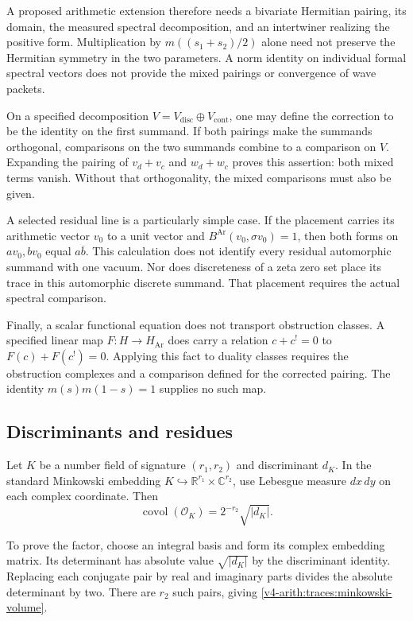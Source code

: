 A proposed arithmetic extension therefore needs a bivariate Hermitian
pairing, its domain, the measured spectral decomposition, and an intertwiner
realizing the positive form. Multiplication by $m((s_1+s_2)/2)$ alone need
not preserve the Hermitian symmetry in the two parameters. A norm identity
on individual formal spectral vectors does not provide the mixed pairings or
convergence of wave packets.

On a specified decomposition $V=V_{\mathrm{disc}}\oplus V_{\mathrm{cont}}$,
one may define the correction to be the identity on the first summand. If
both pairings make the summands orthogonal, comparisons on the two summands
combine to a comparison on $V$. Expanding the pairing of $v_d+v_c$ and
$w_d+w_c$ proves this assertion: both mixed terms vanish. Without that
orthogonality, the mixed comparisons must also be given.

A selected residual line is a particularly simple case. If the placement
carries its arithmetic vector $v_0$ to a unit vector and
$B^{\mathrm{Ar}}(v_0,\sigma v_0)=1$, then both forms on $av_0,bv_0$ equal
$a\overline b$. This calculation does not identify every residual
automorphic summand with one vacuum. Nor does discreteness of a zeta zero
set place its trace in this automorphic discrete summand. That placement
requires the actual spectral comparison.

Finally, a scalar functional equation does not transport obstruction
classes. A specified linear map $F:H\to H_{\mathrm{Ar}}$ does carry a
relation $c+c^!=0$ to $F(c)+F(c^!)=0$. Applying this fact to duality classes
requires the obstruction complexes and a comparison defined for the
corrected pairing. The identity $m(s)m(1-s)=1$ supplies no such map.

\subsection{Discriminants and residues}

Let $K$ be a number field of signature $(r_1,r_2)$ and discriminant $d_K$.
In the standard Minkowski embedding $K\hookrightarrow\mathbb
R^{r_1}\times\mathbb C^{r_2}$, use Lebesgue measure $dx\,dy$ on each complex
coordinate. Then
\begin{equation}
\label{v4-arith:traces:minkowski-volume}
 \operatorname{covol}(\mathcal O_K)
      =2^{-r_2}\sqrt{|d_K|}.
\end{equation}

To prove the factor, choose an integral basis and form its complex embedding
matrix. Its determinant has absolute value $\sqrt{|d_K|}$ by the
discriminant identity. Replacing each conjugate pair by real and imaginary
parts divides the absolute determinant by two. There are $r_2$ such pairs,
giving \eqref{v4-arith:traces:minkowski-volume}.

